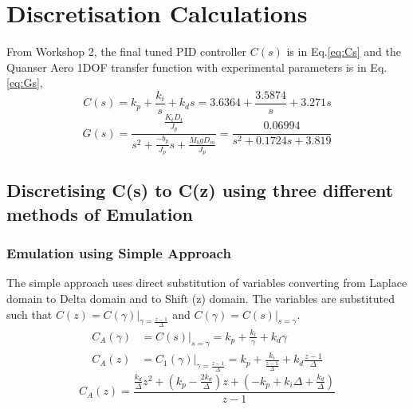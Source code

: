 \documentclass[11pt]{article}
\begin{document}
\section{Discretisation Calculations}\label{section:calcs}
From Workshop 2, the final tuned PID controller $C(s)$ is in Eq.\ref{eq:Cs} and the Quanser Aero 1DOF transfer function with  experimental parameters is in Eq.\ref{eq:Gs}, 
\begin{equation}\label{eq:Cs}
    C(s) = k_p + \frac{k_i}{s} + k_d s = 3.6364 + \frac{3.5874}{s} + 3.271s
\end{equation}
\begin{equation}\label{eq:Gs}
    G(s) = \frac{\frac{K_t D_t}{J_p}}{s^2 + \frac{-b_p}{J_p}s + \frac{M_b g D_m}{J_p}} = \frac{0.06994}{s^2 + 0.1724s + 3.819}
\end{equation}
\subsection{Discretising C(s) to C(z) using three different methods of Emulation}
\subsubsection{Emulation using Simple Approach}
The simple approach uses direct substitution of variables converting from Laplace domain to Delta domain and to Shift (z) domain. The variables are substituted such that $C(z) = C(\gamma)|_{\gamma = \frac{z - 1}{\Delta}}$ and $C(\gamma) = C(s)|_{s = \gamma}$.
\begin{align*}
    C_A(\gamma) &= C(s)|_{s = \gamma} = k_p + \frac{k_i}{\gamma} + k_d \gamma\\
    C_A(z) &= C_1(\gamma)|_{\gamma = \frac{z-1}{\Delta} } = k_p + \frac{k_i}{\frac{z-1}{\Delta}} + k_d \frac{z-1}{\Delta}
\end{align*}
\begin{equation}\label{eq:CAz}
    C_A(z)= \frac{\frac{k_d}{\Delta} z^2 + (k_p - \frac{2 k_d}{\Delta})z + (- k_p + k_i \Delta + \frac{k_d}{\Delta})}{z-1}
\end{equation}
\end{document}
